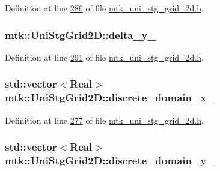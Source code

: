 Definition at line \hyperlink{mtk__uni__stg__grid__2d_8h_source_l00286}{286} of file \hyperlink{mtk__uni__stg__grid__2d_8h_source}{mtk\+\_\+uni\+\_\+stg\+\_\+grid\+\_\+2d.\+h}.

\hypertarget{classmtk_1_1UniStgGrid2D_ace5af3c991f241a895318b9761db73eb}{
\subsubsection[{delta\+\_\+y\+\_\+}]{ mtk\+::\+Uni\+Stg\+Grid2\+D\+::delta\+\_\+y\+\_\+\hspace{0.3cm}{\ttfamily [private]}}}\label{classmtk_1_1UniStgGrid2D_ace5af3c991f241a895318b9761db73eb}


Definition at line \hyperlink{mtk__uni__stg__grid__2d_8h_source_l00291}{291} of file \hyperlink{mtk__uni__stg__grid__2d_8h_source}{mtk\+\_\+uni\+\_\+stg\+\_\+grid\+\_\+2d.\+h}.

\hypertarget{classmtk_1_1UniStgGrid2D_ab15979865852583a46662ea592f27a4f}{
\subsubsection[{discrete\+\_\+domain\+\_\+x\+\_\+}]{\setlength{\rightskip}{0pt plus 5cm}std\+::vector$<${\bf Real}$>$ mtk\+::\+Uni\+Stg\+Grid2\+D\+::discrete\+\_\+domain\+\_\+x\+\_\+\hspace{0.3cm}{\ttfamily [private]}}}\label{classmtk_1_1UniStgGrid2D_ab15979865852583a46662ea592f27a4f}


Definition at line \hyperlink{mtk__uni__stg__grid__2d_8h_source_l00277}{277} of file \hyperlink{mtk__uni__stg__grid__2d_8h_source}{mtk\+\_\+uni\+\_\+stg\+\_\+grid\+\_\+2d.\+h}.

\hypertarget{classmtk_1_1UniStgGrid2D_ad69f93d4b27707d97f209b907383a7a2}{
\subsubsection[{discrete\+\_\+domain\+\_\+y\+\_\+}]{\setlength{\rightskip}{0pt plus 5cm}std\+::vector$<${\bf Real}$>$ mtk\+::\+Uni\+Stg\+Grid2\+D\+::discrete\+\_\+domain\+\_\+y\+\_\+\hspace{0.3cm}{\ttfamily [private]}}}\label{classmtk_1_1UniStgGrid2D_ad69f93d4b27707d97f209b907383a7a2}


